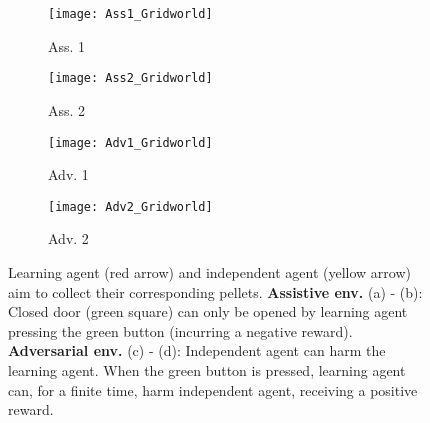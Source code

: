 \begin{figure}[!h]
     \centering
     \begin{subfigure}{0.18\textwidth}
         \centering
         \texttt{[image: Ass1\_Gridworld]}
         \caption{Ass. 1}
         \label{fig:y equals x}
     \end{subfigure}
     \begin{subfigure}[b]{0.18\textwidth}
         \centering
         \texttt{[image: Ass2\_Gridworld]}
         \caption{Ass. 2}
         \label{fig:three sin x}
     \end{subfigure}
     \begin{subfigure}[b]{0.18\textwidth}
         \centering
         \texttt{[image: Adv1\_Gridworld]}
         \caption{Adv. 1}
         \label{fig:three sin x}
     \end{subfigure}
     \begin{subfigure}[b]{0.18\textwidth}
         \centering
         \texttt{[image: Adv2\_Gridworld]}
         \caption{Adv. 2}
         \label{fig:three sin x}
     \end{subfigure}
        \caption{Learning agent (red arrow) and independent agent (yellow arrow) aim to collect their corresponding pellets. \textbf{Assistive env.} (a) - (b): Closed door (green square) can only be opened by learning agent pressing the green button (incurring a negative reward).  \textbf{Adversarial env.} (c) - (d): Independent agent can harm the learning agent. When the green button is pressed, learning agent can, for a finite time, harm independent agent, receiving a positive reward.}
        \label{fig:Environment_layout}
\vskip -0.2in
\end{figure}

